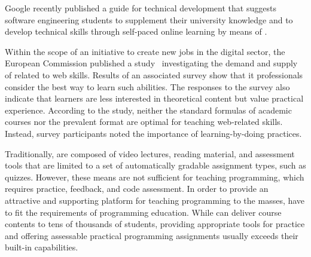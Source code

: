 Google recently published a guide for technical development that suggests software engineering students to supplement their university knowledge and to develop technical skills through self-paced online learning by means of \moocs.

Within the scope of an initiative to create new jobs in the digital sector, the European Commission published a study~\cite{european2014support} investigating the demand and supply of \moocs related to web skills. Results of an associated survey show that \gls{it} professionals consider \moocs the best way to learn such abilities. The responses to the survey also indicate that learners are less interested in theoretical content but value practical experience. According to the study, neither the standard formulas of academic courses nor the prevalent \mooc format are optimal for teaching web-related skills. Instead, survey participants noted the importance of learning-by-doing practices.

Traditionally, \moocs are composed of video lectures, reading material, and assessment tools that are limited to a set of automatically gradable assignment types, such as quizzes. However, these means are not sufficient for teaching programming, which requires practice, feedback, and code assessment. In order to provide an attractive and supporting platform for teaching programming to the masses, \moocs have to fit the requirements of programming education. While \moocs can deliver course contents to tens of thousands of students, providing appropriate tools for practice and offering assessable practical programming assignments usually exceeds their built-in capabilities.
